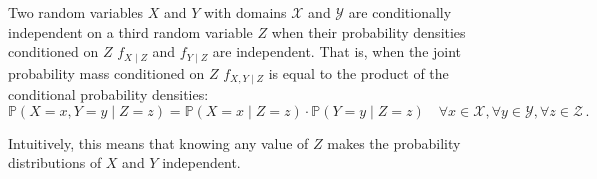 \begin{definition}
	Two random variables $X$ and $Y$ with domains $\mathcal{X}$ and $\mathcal{Y}$ are conditionally independent on a third random variable $Z$ when their probability densities conditioned on $Z$ $f_{X \mid Z}$ and $f_{Y \mid Z}$ are independent.
	That is, when the joint probability mass conditioned on $Z$ $f_{X, Y \mid Z}$ is equal to the product of the conditional probability densities:
	\begin{equation*}
		\mathbb{P}(X=x,Y=y \mid Z=z) = \mathbb{P}(X=x \mid Z=z) \cdot \mathbb{P}(Y=y \mid Z=z) \quad \forall x \in \mathcal{X}, \forall y \in \mathcal{Y}, \forall z \in \mathcal{Z} \,.
	\end{equation*}
\end{definition}
Intuitively, this means that knowing any value of $Z$ makes the probability distributions of $X$ and $Y$ independent.
